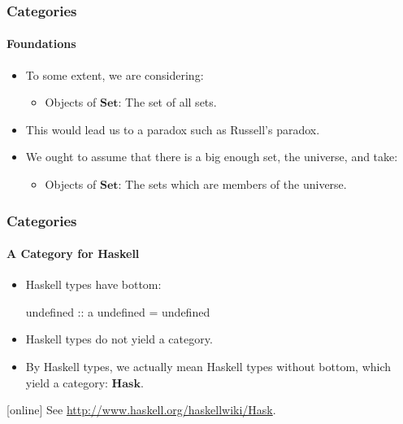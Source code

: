 \documentclass{beamer}
\newcommand{\catbf}[1]{\ensuremath{\mathbf{#1}}\xspace}
\newcommand{\hask}{\catbf{Hask}}
\newcommand{\set}{\catbf{Set}}
\begin{document}
\begin{frame}[label={re:foundations}]
  \frametitle{Categories}
  \framesubtitle{Foundations}

  \begin{itemize}
  \item
    To some extent, we are considering:
    \begin{itemize}
    \item
      Objects of \set: The set of all sets.
    \end{itemize}
  \item
    This would lead us to a paradox such as Russell's paradox.
  \end{itemize}
  \begin{itemize}
  \item
    We ought to assume that there is a big enough set, the universe,
    and take:
    \begin{itemize}
    \item
      Objects of \set: The sets which are members of the universe.
    \end{itemize}
  \end{itemize}

\end{frame}


\begin{frame}[fragile,label={re:hask}]
  \frametitle{Categories}
  \framesubtitle{A Category for Haskell}

  \begin{itemize}
  \item
    Haskell types have bottom:
    \begin{code}
undefined :: a
undefined = undefined
    \end{code}
  \item
    Haskell types do not yield a category.
  \end{itemize}
  \begin{itemize}
  \item
    By Haskell types, we actually mean Haskell types without bottom,
    which yield a category: \hask.
  \end{itemize}
  \begin{thebibliography}{}
  [online]
  \bibitem[]{}
    \newblock See \url{http://www.haskell.org/haskellwiki/Hask}.
  \end{thebibliography}
  \vfill\hfill\hyperlink{ex:hask}{}

\end{frame}
\end{document}
